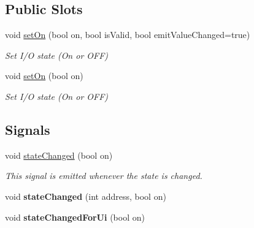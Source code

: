 \subsection*{Public Slots}
\begin{DoxyCompactItemize}
\item 
void \hyperlink{classmdt_digital_io_a8feb155c430f67589ba776b7b03758d9}{setOn} (bool on, bool isValid, bool emitValueChanged=true)
\begin{DoxyCompactList}\small\item\em Set I/O state (On or OFF) \end{DoxyCompactList}\item 
void \hyperlink{classmdt_digital_io_a88308968532c1e23f695c43a62a3be40}{setOn} (bool on)
\begin{DoxyCompactList}\small\item\em Set I/O state (On or OFF) \end{DoxyCompactList}\end{DoxyCompactItemize}
\subsection*{Signals}
\begin{DoxyCompactItemize}
\item 
\hypertarget{classmdt_digital_io_a69c20119906682c0bd90833598127328}{
void \hyperlink{classmdt_digital_io_a69c20119906682c0bd90833598127328}{stateChanged} (bool on)}
\label{classmdt_digital_io_a69c20119906682c0bd90833598127328}

\begin{DoxyCompactList}\small\item\em This signal is emitted whenever the state is changed. \end{DoxyCompactList}\item 
\hypertarget{classmdt_digital_io_a0bb6637d6ee81c7c3310b04f7fb743a4}{
void {\bfseries stateChanged} (int address, bool on)}
\label{classmdt_digital_io_a0bb6637d6ee81c7c3310b04f7fb743a4}

\item 
\hypertarget{classmdt_digital_io_ab50657b37b4915bd142aa0f22f45fd41}{
void {\bfseries stateChangedForUi} (bool on)}
\label{classmdt_digital_io_ab50657b37b4915bd142aa0f22f45fd41}

\end{DoxyCompactItemize}

